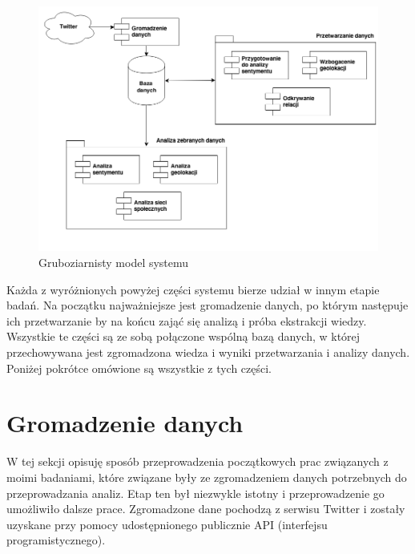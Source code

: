 \begin{figure}[ht!]
\centering
\includegraphics[width=140mm]{img/budowa-systemu.png}
\caption{Gruboziarnisty model systemu}
\label{image:gruboziarnisty-model-systemu}
\end{figure}

Każda z wyróżnionych powyżej części systemu bierze udział w innym etapie
badań. Na początku najważniejsze jest gromadzenie danych, po którym następuje
ich przetwarzanie by na końcu zająć się analizą i próba ekstrakcji wiedzy.
Wszystkie te części są ze sobą połączone wspólną bazą danych, w której
przechowywana jest zgromadzona wiedza i wyniki przetwarzania i analizy danych.
Poniżej pokrótce omówione są wszystkie z tych części.  

\section{Gromadzenie danych}
\label{section:gromadzeniedanych}
W tej sekcji opisuję sposób przeprowadzenia początkowych prac związanych
z moimi badaniami, które związane były ze zgromadzeniem danych potrzebnych
do przeprowadzania analiz. Etap ten był niezwykle istotny i przeprowadzenie
go umożliwiło dalsze prace. Zgromadzone dane pochodzą z serwisu Twitter
i zostały uzyskane przy pomocy udostępnionego publicznie API (interfejsu
programistycznego).

